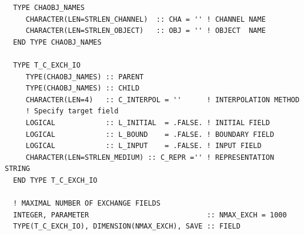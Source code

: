 \documentclass[11pt,twoside]{article}
\begin{document}
\begin{verbatim}
  TYPE CHAOBJ_NAMES
     CHARACTER(LEN=STRLEN_CHANNEL)  :: CHA = '' ! CHANNEL NAME 
     CHARACTER(LEN=STRLEN_OBJECT)   :: OBJ = '' ! OBJECT  NAME 
  END TYPE CHAOBJ_NAMES

  TYPE T_C_EXCH_IO
     TYPE(CHAOBJ_NAMES) :: PARENT
     TYPE(CHAOBJ_NAMES) :: CHILD
     CHARACTER(LEN=4)   :: C_INTERPOL = ''      ! INTERPOLATION METHOD
     ! Specify target field
     LOGICAL            :: L_INITIAL  = .FALSE. ! INITIAL FIELD
     LOGICAL            :: L_BOUND    = .FALSE. ! BOUNDARY FIELD
     LOGICAL            :: L_INPUT    = .FALSE. ! INPUT FIELD 
     CHARACTER(LEN=STRLEN_MEDIUM) :: C_REPR ='' ! REPRESENTATION STRING
  END TYPE T_C_EXCH_IO

  ! MAXIMAL NUMBER OF EXCHANGE FIELDS
  INTEGER, PARAMETER                            :: NMAX_EXCH = 1000
  TYPE(T_C_EXCH_IO), DIMENSION(NMAX_EXCH), SAVE :: FIELD
\end{verbatim}
\end{document}
